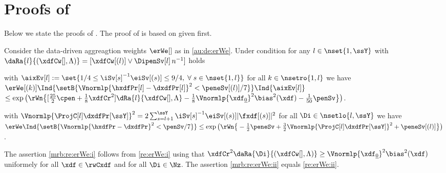 \section{Proofs of }\label{a:au:mrb}
\begin{te}
 Below  we state the proofs of  . The  proof of  is based on  given first.
\end{te}
\begin{cor}\label{mrb:re:erWe} Consider the data-driven aggreagtion weights
  $\erWe[]$ as in \eqref{au:de:erWe}. Under condition
   for any $l\in\nset{1,\ssY}$ with
  $\daRa{l}{(\xdfCw[],\Lambda)}=[\xdfCw[(l)]\vee \DipenSv[l]\, n^{-1}]$ holds
  \begin{resListeN}[]
  \item\label{mrb:re:erWe:i} with
    $\aixEv[l]:=\set{1/4\leq\iSv[s]^{-1}\eiSv[(s)]\leq9/4,\;\forall\;s\in\nset{1,l}}$ for all $k\in\nsetro{1,l}$ 
    we have\\
   $\erWe[(k)]\Ind{\setB{\Vnormlp{\hxdfPr[l]-\dxdfPr[l]}^2<\peneSv[(l)]/7}}\Ind{\aixEv[l]}$\\\null\hfill$\leq
  \exp\big(\rWn\big\{[\tfrac{25}{2}\cpen+\tfrac{1}{8}\xdfCr^2]\dRa{l}{\xdfCw[],\Lambda}-\tfrac{1}{8}\Vnormlp{\xdf_{\underline{0}}}^2\bias^2(\xdf)-\tfrac{1}{50}\penSv\big\}\big)$.
  \item\label{mrb:re:erWe:ii} with $\Vnormlp{\ProjC[l]\dxdfPr[\ssY]}^2=2\sum_{s=l+1}^{\ssY}\iSv[s]^{-1}\eiSv[(s)]\vert\fxdf[(s)]\vert^2$
    for all $\Di\in\nsetlo{l,\ssY}$ we have\\
    $\erWe\Ind{\setB{\Vnormlp{\hxdfPr-\dxdfPr}^2<\penSv/7}} \leq
   \exp\big(\rWn\big\{-\tfrac{1}{2}\peneSv+\tfrac{3}{2}\Vnormlp{\ProjC[l]\dxdfPr[\ssY]}^2+\peneSv[(l)]\big\}\big)$.
  \end{resListeN}
\end{cor}
\begin{pro}The assertion
  \ref{mrb:re:erWe:i} follows from  \ref{re:erWe:i}
  using that $\xdfCr^2\daRa{\Di}{(\xdfCw[],\Lambda)}\geq\Vnormlp{\xdf_{\underline{0}}}^2\bias^2(\xdf)$
uniformely for all $\xdf\in\rwCxdf$ and for all
$\Di\in\Nz$.  The assertion
  \ref{mrb:re:erWe:ii} equals  \ref{re:erWe:ii}.\proEnd
\end{pro}
